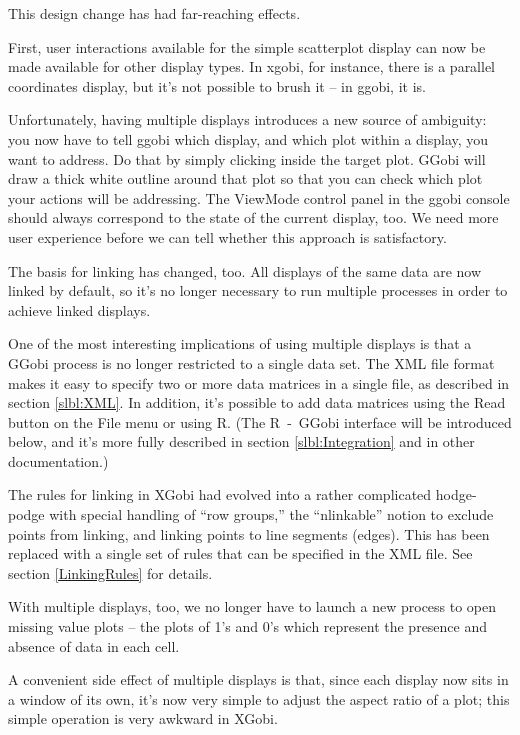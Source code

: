 \documentclass[11pt]{article}
\begin{document}
This design change has had far-reaching effects.

First, user interactions available for the simple scatterplot display
can now be made available for other display types.  In xgobi, for
instance, there is a parallel coordinates display, but it's not
possible to brush it -- in ggobi, it is.

Unfortunately, having multiple displays introduces a new source of
ambiguity: you now have to tell ggobi which display, and which plot
within a display, you want to address.  Do that by simply clicking
inside the target plot.  GGobi will draw a thick white outline around
that plot so that you can check which plot your actions will be
addressing.  The ViewMode control panel in the ggobi console should
always correspond to the state of the current display, too.  We need
more user experience before we can tell whether this approach is
satisfactory.

The basis for linking has changed, too.  All displays of the same data
are now linked by default, so it's no longer necessary to run
multiple processes in order to achieve linked displays.

One of the most interesting implications of using multiple displays
is that a GGobi process is no longer restricted to a single data
set.  The XML file format makes it easy to specify two or more data
matrices in a single file, as described in section \ref{slbl:XML}.
In addition, it's possible to add data matrices using the Read button
on the File menu or using R.  (The R~-~GGobi interface will be
introduced below, and it's more fully described in section
\ref{slbl:Integration} and in other documentation.)

The rules for linking in XGobi had evolved into a rather complicated
hodge-podge with special handling of ``row groups,'' the
``nlinkable'' notion to exclude points from linking, and linking
points to line segments (edges).  This has been replaced with a single set
of rules that can be specified in the XML file.  See section 
\ref{LinkingRules} for details.

With multiple displays, too, we no longer have to launch a new
process to open missing value plots -- the plots of 1's and 0's
which represent the presence and absence of data in each cell.

A convenient side effect of multiple displays is that, since each
display now sits in a window of its own, it's now very simple to
adjust the aspect ratio of a plot; this simple operation is very
awkward in XGobi.
\end{document}
